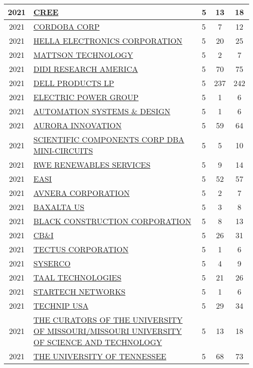 \documentclass{article}%
\begin{document}
\begin{longtable}{c|p{20em}|p{5em}|c|c}
\hline%
2021&\hyperref[subsec:CREE]{CREE}&5&13&18\\%
\hline%
2021&\hyperref[subsec:CORDOBACORP]{CORDOBA CORP}&5&7&12\\%
\hline%
2021&\hyperref[subsec:HELLAELECTRONICSCORPORATION]{HELLA ELECTRONICS CORPORATION}&5&20&25\\%
\hline%
2021&\hyperref[subsec:MATTSONTECHNOLOGY]{MATTSON TECHNOLOGY}&5&2&7\\%
\hline%
2021&\hyperref[subsec:DIDIRESEARCHAMERICA]{DIDI RESEARCH AMERICA}&5&70&75\\%
\hline%
2021&\hyperref[subsec:DELLPRODUCTSLP]{DELL PRODUCTS LP}&5&237&242\\%
\hline%
2021&\hyperref[subsec:ELECTRICPOWERGROUP]{ELECTRIC POWER GROUP}&5&1&6\\%
\hline%
2021&\hyperref[subsec:AUTOMATIONSYSTEMSDESIGN]{AUTOMATION SYSTEMS \& DESIGN}&5&1&6\\%
\hline%
2021&\hyperref[subsec:AURORAINNOVATION]{AURORA INNOVATION}&5&59&64\\%
\hline%
2021&\hyperref[subsec:SCIENTIFICCOMPONENTSCORPDBAMINI{-}CIRCUITS]{SCIENTIFIC COMPONENTS CORP DBA MINI{-}CIRCUITS}&5&5&10\\%
\hline%
2021&\hyperref[subsec:RWERENEWABLESSERVICES]{RWE RENEWABLES SERVICES}&5&9&14\\%
\hline%
2021&\hyperref[subsec:EASI]{EASI}&5&52&57\\%
\hline%
2021&\hyperref[subsec:AVNERACORPORATION]{AVNERA CORPORATION}&5&2&7\\%
\hline%
2021&\hyperref[subsec:BAXALTAUS]{BAXALTA US}&5&3&8\\%
\hline%
2021&\hyperref[subsec:BLACKCONSTRUCTIONCORPORATION]{BLACK CONSTRUCTION CORPORATION}&5&8&13\\%
\hline%
2021&\hyperref[subsec:CBI]{CB\&I}&5&26&31\\%
\hline%
2021&\hyperref[subsec:TECTUSCORPORATION]{TECTUS CORPORATION}&5&1&6\\%
\hline%
2021&\hyperref[subsec:SYSERCO]{SYSERCO}&5&4&9\\%
\hline%
2021&\hyperref[subsec:TAALTECHNOLOGIES]{TAAL TECHNOLOGIES}&5&21&26\\%
\hline%
2021&\hyperref[subsec:STARTECHNETWORKS]{STARTECH NETWORKS}&5&1&6\\%
\hline%
2021&\hyperref[subsec:TECHNIPUSA]{TECHNIP USA}&5&29&34\\%
\hline%
2021&\hyperref[subsec:THECURATORSOFTHEUNIVERSITYOFMISSOURI/MISSOURIUNIVERSITYOFSCIENCEANDTECHNOLOGY]{THE CURATORS OF THE UNIVERSITY OF MISSOURI/MISSOURI UNIVERSITY OF SCIENCE AND TECHNOLOGY}&5&13&18\\%
\hline%
2021&\hyperref[subsec:THEUNIVERSITYOFTENNESSEE]{THE UNIVERSITY OF TENNESSEE}&5&68&73\\%
\hline%
\end{longtable}
\end{document}
